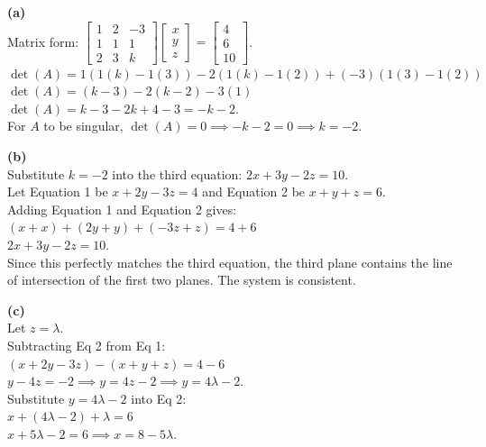 \begin{solution}
\textbf{(a)} \\
Matrix form: $\begin{bmatrix} 1 & 2 & -3 \\ 1 & 1 & 1 \\ 2 & 3 & k \end{bmatrix} \begin{bmatrix} x \\ y \\ z \end{bmatrix} = \begin{bmatrix} 4 \\ 6 \\ 10 \end{bmatrix}$. \\
$\det(A) = 1(1(k) - 1(3)) - 2(1(k) - 1(2)) + (-3)(1(3) - 1(2))$ \\
$\det(A) = (k - 3) - 2(k - 2) - 3(1)$ \\
$\det(A) = k - 3 - 2k + 4 - 3 = -k - 2$. \\
For $A$ to be singular, $\det(A) = 0 \implies -k - 2 = 0 \implies k = -2$.

\medskip
\textbf{(b)} \\
Substitute $k = -2$ into the third equation: $2x + 3y - 2z = 10$. \\
Let Equation 1 be $x + 2y - 3z = 4$ and Equation 2 be $x + y + z = 6$. \\
Adding Equation 1 and Equation 2 gives: \\
$(x + x) + (2y + y) + (-3z + z) = 4 + 6$ \\
$2x + 3y - 2z = 10$. \\
Since this perfectly matches the third equation, the third plane contains the line of intersection of the first two planes. The system is consistent.

\medskip
\textbf{(c)} \\
Let $z = \lambda$. \\
Subtracting Eq 2 from Eq 1: \\
$(x + 2y - 3z) - (x + y + z) = 4 - 6$ \\
$y - 4z = -2 \implies y = 4z - 2 \implies y = 4\lambda - 2$. \\
Substitute $y = 4\lambda - 2$ into Eq 2: \\
$x + (4\lambda - 2) + \lambda = 6$ \\
$x + 5\lambda - 2 = 6 \implies x = 8 - 5\lambda$.


\end{solution}
